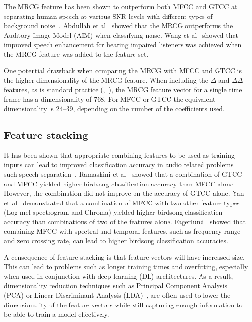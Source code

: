 The MRCG feature has been shown to outperform both MFCC and GTCC at
separating human speech at various SNR levels with different types of
background noise~\cite{chen2014feature}. Abdullah et
al~\cite{binti2020comparison} showed that the MRCG outperforms the Auditory
Image Model (AIM) when classifying noise. Wang et al~\cite{wang2016joint} showed
that improved speech enhancement for hearing impaired listeners was achieved
when the MRCG feature was added to the feature set.

One potential drawback when comparing the MRCG with MFCC and GTCC is the higher
dimensionality of the MRCG feature. When including the $\Delta$ and
$\Delta\Delta$ features, as is standard practice
(\cite{binti2020comparison},~\cite{wang2016joint}), the MRCG feature vector for
a single time frame has a dimensionality of 768. For MFCC or GTCC the equivalent
dimensionality is 24--39, depending on the number of the coefficients used.

\subsection{Feature stacking}

It has been shown that appropriate combining features to be used as training
inputs can lead to improved classification accuracy in audio related problems
such speech separation~\cite{wang2012exploring}. Ramashini et
al~\cite{ramashini2022robust} showed that a combination of GTCC and MFCC yielded
higher birdsong classification accuracy than MFCC alone. However, the
combination did not improve on the accuracy of GTCC alone. Yan et
al~\cite{yan2021birdsong} demonstrated that a combination of MFCC with two other
feature types (Log-mel spectrogram and Chroma) yielded higher birdsong
classification accuracy than combinations of two of the features alone.
Fagerlund~\cite{fagerlund2007bird} showed that combining MFCC with spectral and
temporal features, such as frequency range and zero crossing rate, can lead to
higher birdsong classification accuracies.

A consequence of feature stacking is that feature vectors will have increased
size. This can lead to problems such as longer training times and overfitting,
especially when used in conjunction with deep learning (DL) architectures. As a
result, dimensionality reduction techniques such as Principal Component
Analysis (PCA) or Linear Discriminant Analysis (LDA)~\cite{ramashini2019bird},
are often used to lower the dimensionality of the feature vectors while still
capturing enough information to be able to train a model effectively.

